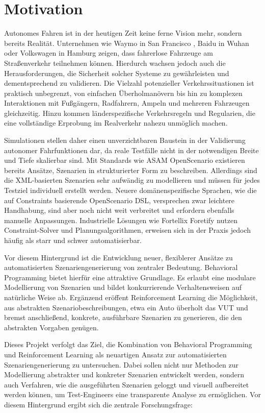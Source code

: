 \chapter{Motivation}
Autonomes Fahren ist in der heutigen Zeit keine ferne Vision mehr, sondern bereits Realität. Unternehmen wie Waymo in San Francisco \cite{WaymoRobotaxis2025}, Baidu in Wuhan \cite{BaiduRobotaxi2024} oder Volkswagen in Hamburg \cite{VolkswagenRobotaxis2025} zeigen, dass fahrerlose Fahrzeuge am Straßenverkehr teilnehmen können. Hierdurch wachsen jedoch auch die Herausforderungen, die Sicherheit solcher Systeme zu gewährleisten und dementsprechend zu validieren. Die Vielzahl potenzieller Verkehrssituationen ist praktisch unbegrenzt, von einfachen Überholmanövern bis hin zu komplexen Interaktionen mit Fußgängern, Radfahrern, Ampeln und mehreren Fahrzeugen gleichzeitig. Hinzu kommen länderspezifische Verkehrsregeln und Regularien, die eine vollständige Erprobung im Realverkehr nahezu unmöglich machen.

Simulationen stellen daher einen unverzichtbaren Baustein in der Validierung autonomer Fahrfunktionen dar, da reale Testfälle nicht in der notwendigen Breite und Tiefe skalierbar sind. Mit Standards wie ASAM OpenScenario existieren bereits Ansätze, Szenarien in strukturierter Form zu beschreiben. Allerdings sind die XML-basierten Szenarien sehr aufwändig zu modellieren und müssen für jedes Testziel individuell erstellt werden. Neuere domänenspezifische Sprachen, wie die auf Constraints basierende OpenScenario DSL, versprechen zwar leichtere Handhabung, sind aber noch nicht weit verbreitet und erfordern ebenfalls manuelle Anpassungen. Industrielle Lösungen wie Fortellix Foretify nutzen Constraint-Solver und Planungsalgorithmen, erweisen sich in der Praxis jedoch häufig als starr und schwer automatisierbar.

Vor diesem Hintergrund ist die Entwicklung neuer, flexiblerer Ansätze zu automatisierten Szenariengenerierung von zentraler Bedeutung. Behavioral Programming bietet hierfür eine attraktive Grundlage. Es erlaubt eine modulare Modellierung von Szenarien und bildet konkurrierende Verhaltensweisen auf natürliche Weise ab. Ergänzend eröffent Reinforcement Learning die Möglichkeit, aus abstrakten Szenariobeschreibungen, etwa ein Auto überholt das VUT und bremst anschließend, konkrete, ausführbare Szenarien zu generieren, die den abstrakten Vorgaben genügen.

Dieses Projekt verfolgt das Ziel, die Kombination von Behavioral Programming und Reinforcement Learning als neuartigen Ansatz zur automatisierten Szenariengenerierung zu untersuchen. Dabei sollen nicht nur Methoden zur Modellierung abstrakter und konkreter Szenarien entwickelt werden, sondern auch Verfahren, wie die ausgeführten Szenarien geloggt und visuell aufbereitet werden können, um Test-Engineers eine transparente Analyse zu ermöglichen. Vor diesem Hintergrund ergibt sich die zentrale Forschungsfrage: 


